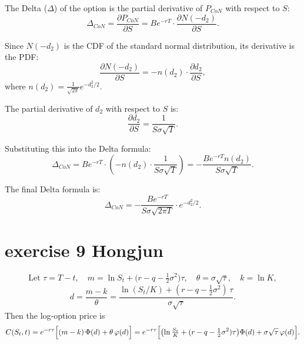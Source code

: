 \documentclass{article}
\begin{document}
The Delta ($\Delta$) of the option is the partial derivative of $P_{CoN}$ with respect to $S$:
\[
    \Delta_{CoN} = \frac{\partial P_{CoN}}{\partial S} = B e^{-rT} \cdot \frac{\partial N(-d_2)}{\partial S}.
\]

Since $N(-d_2)$ is the CDF of the standard normal distribution, its derivative is the PDF:
\[
    \frac{\partial N(-d_2)}{\partial S} = -n(d_2) \cdot \frac{\partial d_2}{\partial S},
\]
where $n(d_2) = \frac{1}{\sqrt{2\pi}} e^{-d_2^2/2}$.

The partial derivative of $d_2$ with respect to $S$ is:
\[
    \frac{\partial d_2}{\partial S} = \frac{1}{S \sigma \sqrt{T}}.
\]

Substituting this into the Delta formula:
\[
    \Delta_{CoN} = B e^{-rT} \cdot \left( -n(d_2) \cdot \frac{1}{S \sigma \sqrt{T}} \right) = -\frac{B e^{-rT} n(d_2)}{S \sigma \sqrt{T}}.
\]

The final Delta formula is:
\[
    \Delta_{CoN} = -\frac{B e^{-rT}}{S \sigma \sqrt{2\pi T}} \cdot e^{-d_2^2/2}.
\]


\section{exercise 9 Hongjun}
\[
    \text{Let }\tau = T - t,\quad m = \ln S_t + \bigl(r - q - \tfrac12\sigma^2\bigr)\tau,\quad
    \theta = \sigma\sqrt{\tau},\quad k = \ln K,
\]
\[
    d = \frac{m - k}{\theta}
    = \frac{\ln(S_t/K) + (r - q - \tfrac12\sigma^2)\,\tau}{\sigma\sqrt{\tau}}.
\]
Then the log‐option price is
\[
    C(S_t,t)
    = e^{-r\tau}\Bigl[(m-k)\,\Phi(d) + \theta\,\varphi(d)\Bigr]
    = e^{-r\tau}\Bigl[\bigl(\ln\tfrac{S_t}{K}+(r-q-\tfrac12\sigma^2)\tau\bigr)\Phi(d)
        +\sigma\sqrt{\tau}\,\varphi(d)\Bigr].
\]
\end{document}
